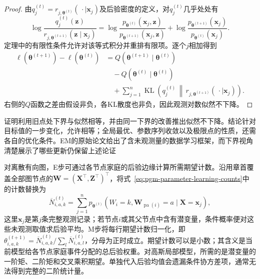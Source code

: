 \begin{proof}
  由$q_j^{(t)}=r_{j,\bm{\theta}^{(t)}}(\,\cdot\mid\bm{x}_j)$及后验密度的定义，对$q_j^{(t)}$几乎处处有
  \[
    \log\frac{q_j^{(t)}(\bm{z})}
                  {r_{j,\bm{\theta}^{(t+1)}}(\bm{z}\mid\bm{x}_j)}
    =
    \log\frac{p_{\bm{\theta}^{(t)}}(\bm{x}_j,\bm{z})}
                  {p_{\bm{\theta}^{(t+1)}}(\bm{x}_j,\bm{z})}
    +\log\frac{p_{\bm{\theta}^{(t+1)}}(\bm{x}_j)}
                   {p_{\bm{\theta}^{(t)}}(\bm{x}_j)}.
  \]
  定理中的有限性条件允许对该等式积分并重排有限项。逐个$j$相加得到
  \[
    \begin{aligned}
      \ell(\bm{\theta}^{(t+1)})-\ell(\bm{\theta}^{(t)})
      &=
      Q(\bm{\theta}^{(t+1)}\mid\bm{\theta}^{(t)})\\
      &\quad-Q(\bm{\theta}^{(t)}\mid\bm{\theta}^{(t)})\\
      &\quad+\sum_{j=1}^n
        \operatorname{KL}\!\left(
          q_j^{(t)}\,\middle\|\,
          r_{j,\bm{\theta}^{(t+1)}}(\,\cdot\mid\bm{x}_j)
        \right).
    \end{aligned}
  \]
  右侧的$Q$函数之差由假设非负，各KL散度也非负，因此观测对数似然不下降。
\end{proof}

证明利用旧点处下界与似然相等，并由同一下界的改善推出似然不下降。结论针对目标值的一步变化，允许相等；全局最优、参数序列收敛以及极限点的性质，还需各自的优化条件。EM的原始论文给出了含未观测量的数据学习框架，而下界视角清楚展示了哪些更新仍保留上述论证

对离散有向图，E步可通过各节点家庭的后验边缘计算所需期望计数。沿用章首覆盖全部图节点的$\bm{W}=(\bm{X}^\top,\bm{Z}^\top)^\top$，将式~\eqref{eq:pgm-parameter-learning-counts}中的计数替换为
\begin{equation}
  \overline N_{i,a,k}^{(t)}
    =\sum_{j=1}^n
      p_{\bm{\theta}^{(t)}}\!
        \left(W_i=k,\bm{W}_{\operatorname{pa}(i)}=a
                    \mid\bm{X}=\bm{x}_j\right),
  \label{eq:pgm-parameter-learning-expected-counts}
\end{equation}
这里$\bm{x}_j$是第$j$条完整观测记录；若节点$i$或其父节点中含有潜变量，条件概率便对这些未观测取值求后验平均。M步将每行期望计数归一化，即$\theta_{i,a,k}^{(t+1)}=\overline N_{i,a,k}^{(t)}/\sum_l\overline N_{i,a,l}^{(t)}$，分母为正时成立。期望计数可以是小数；其含义是当前模型给各节点家庭事件分配的总后验权重。对高斯局部模型，所需的是潜变量的一阶矩、二阶矩和交叉乘积期望。单独代入后验均值会遗漏条件协方差项，通常无法得到完整的二阶统计量。

